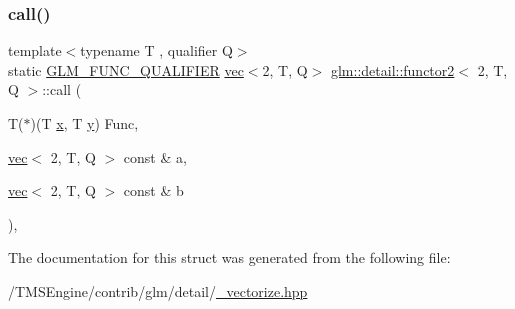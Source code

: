 \subsubsection{\texorpdfstring{call()}{call()}}
{\footnotesize\ttfamily template$<$typename T , qualifier Q$>$ \\
static \hyperlink{setup_8hpp_a33fdea6f91c5f834105f7415e2a64407}{G\+L\+M\+\_\+\+F\+U\+N\+C\+\_\+\+Q\+U\+A\+L\+I\+F\+I\+ER} \hyperlink{structglm_1_1vec}{vec}$<$2, T, Q$>$ \hyperlink{structglm_1_1detail_1_1functor2}{glm\+::detail\+::functor2}$<$ 2, T, Q $>$\+::call (\begin{DoxyParamCaption}\item[{T($\ast$)(T \hyperlink{_s_d_l__opengl_8h_ad0e63d0edcdbd3d79554076bf309fd47}{x}, T \hyperlink{_s_d_l__opengl_8h_a1675d9d7bb68e1657ff028643b4037e3}{y})}]{Func,  }\item[{\hyperlink{structglm_1_1vec}{vec}$<$ 2, T, Q $>$ const \&}]{a,  }\item[{\hyperlink{structglm_1_1vec}{vec}$<$ 2, T, Q $>$ const \&}]{b }\end{DoxyParamCaption})\hspace{0.3cm}{\ttfamily [inline]}, {\ttfamily [static]}}



The documentation for this struct was generated from the following file\+:\begin{DoxyCompactItemize}
\item 
/\+T\+M\+S\+Engine/contrib/glm/detail/\hyperlink{__vectorize_8hpp}{\+\_\+vectorize.\+hpp}\end{DoxyCompactItemize}
